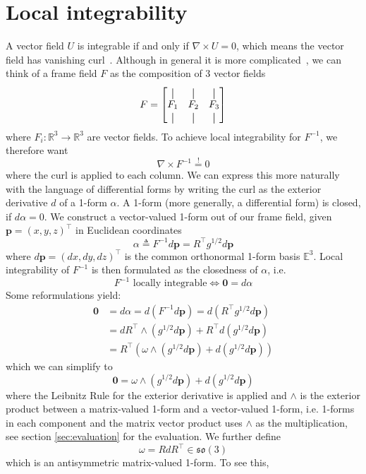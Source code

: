 \documentclass[../thesis.tex]{subfiles}
\begin{document}
\section{Local integrability}
A vector field $U$ is integrable if and only if $\nabla \times U = 0$,
which means the vector field has vanishing curl~\cite{Pap20}.
Although in general it is more complicated~\cite{Nieser}, we can think of a frame field $F$ as the composition of 3 vector fields
$$F = \begin{bmatrix}
  \vertbar & \vertbar & \vertbar \\
  F_1 & F_2 & F_3 \\
  \vertbar & \vertbar & \vertbar
\end{bmatrix}$$
where $F_i : \mathbb{R}^3 \to \mathbb{R}^3$ are vector fields.
To achieve local integrability for $F^{-1}$, we therefore want
$$\nabla \times F^{-1} \overset{!}{=}0$$
where the curl is applied to each column.
We can express this more naturally with the language of differential forms by writing
the curl as the exterior derivative $d$ of a 1-form $\alpha$.
A 1-form (more generally, a differential form) is closed, if $d\alpha = 0$.
We construct a vector-valued 1-form out of our frame field,
given $\bm{p}=(x,y,z)^{\top}$ in Euclidean coordinates
$$\alpha \triangleq F^{-1}d\bm{p} = R^{\top}g^{1/2}d\bm{p}$$
where $d\bm{p} = (dx,dy,dz)^{\top}$ is the common orthonormal 1-form basis $\mathbb{E}^3$.
Local integrability of $F^{-1}$ is then formulated as the closedness of $\alpha$, i.e.
$$F^{-1} \text{ locally integrable} \iff \bm{0} = d\alpha$$
Some reformulations yield:
\begin{align*}
  \bm{0} &= d\alpha = d(F^{-1}d\bm{p}) = d(R^{\top}g^{1/2}d\bm{p})\\
  &= dR^{\top} \wedge  (g^{1/2}d\bm{p}) + R^{\top}d(g^{1/2}d\bm{p}) \\
  &= R^{\top}(\omega \wedge (g^{1/2}d\bm{p})+ d(g^{1/2}d\bm{p}))
\end{align*}
which we can simplify to
\begin{equation}\label{eq:oneform}
  \bm{0} = \omega \wedge (g^{1/2}d\bm{p})+ d(g^{1/2}d\bm{p})
\end{equation}
where the Leibnitz Rule for the exterior derivative is applied
and $\wedge$ is the exterior product between a matrix-valued 1-form and a vector-valued 1-form,
i.e. 1-forms in each component and the matrix vector product uses $\wedge$
as the multiplication, see section \ref{sec:evaluation} for the evaluation.
We further define
$$\omega = RdR^{\top} \in \mathfrak{so}(3)$$
which is an antisymmetric matrix-valued 1-form. To see this, 
\end{document}
